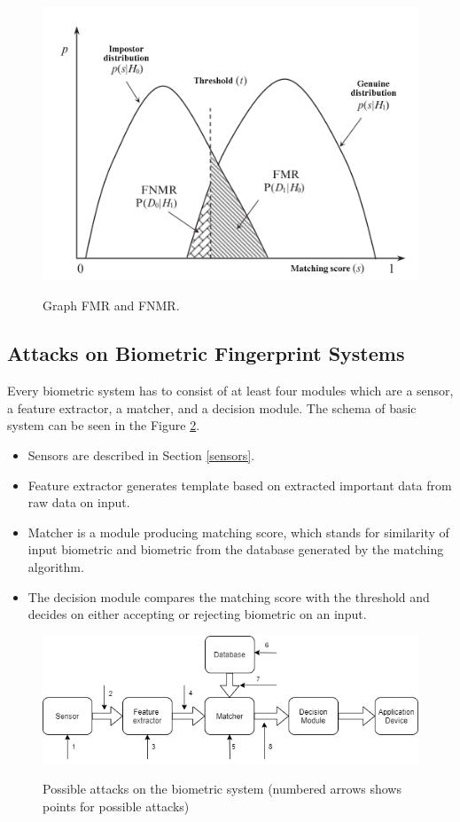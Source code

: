 \begin{figure}[H]
    \centering
        {\includegraphics[width=0.7\linewidth]{obrazky-figures/fmr.png}}\\
        \caption{Graph FMR and FNMR. \cite{maltoni2009handbook}}
        \label{fig:fmr}
\end{figure}

\subsection{Attacks on Biometric Fingerprint Systems}
Every biometric system has to consist of at least four modules which are a sensor, a feature extractor, a matcher, and a decision module. \cite{1262027} The schema of basic system can be seen in the Figure \ref{fig:attack}. 

\begin{itemize}
	\item Sensors are described in Section \ref{sensors}. 
	\item Feature extractor generates template based on extracted important data from raw data on input.
	\item Matcher is a module producing matching score, which stands for similarity of input biometric and biometric from the database generated by the matching algorithm.
	\item The decision module compares the matching score with the threshold and decides on either accepting or rejecting biometric on an input. \cite{1262027}
\end{itemize}

\begin{figure}[H]
    \centering
        {\includegraphics[width=\linewidth]{obrazky-figures/attack.png}}\\
        \caption{Possible attacks on the biometric system (numbered arrows shows points for possible attacks)}
        \label{fig:attack}
\end{figure}

